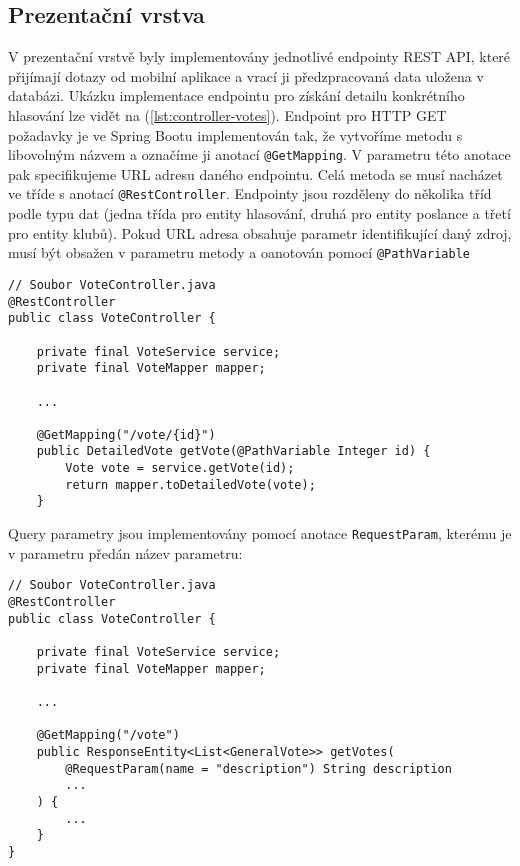\subsection {Prezentační vrstva}
V prezentační vrstvě byly implementovány jednotlivé endpointy REST API, které přijímají dotazy od mobilní aplikace a vrací ji předzpracovaná data uložena v databázi. Ukázku implementace endpointu pro získání detailu konkrétního hlasování lze vidět na (\ref{lst:controller-votes}). Endpoint pro HTTP GET požadavky je ve Spring Bootu implementován tak, že vytvoříme metodu s libovolným názvem a označíme ji anotací \lstinline|@GetMapping|. V parametru této anotace pak specifikujeme URL adresu daného endpointu. Celá metoda se musí nacházet ve tříde s anotací \lstinline|@RestController|. Endpointy jsou rozděleny do několika tříd podle typu dat (jedna třída pro entity hlasování, druhá pro entity poslance a třetí pro entity klubů). Pokud URL adresa obsahuje parametr identifikující daný zdroj, musí být obsažen v parametru metody a oanotován pomocí \lstinline|@PathVariable|

\begin{lstlisting}[caption={Ukázka kódu pro vytvoření endpointu}, label={lst:controller-votes}, tabsize=2]
// Soubor VoteController.java
@RestController
public class VoteController {
	
	private final VoteService service;
	private final VoteMapper mapper;
	
	...
	
 	@GetMapping("/vote/{id}")
	public DetailedVote getVote(@PathVariable Integer id) {
		Vote vote = service.getVote(id);
		return mapper.toDetailedVote(vote);
	}

\end{lstlisting}

\noindent Query parametry jsou implementovány pomocí anotace \lstinline|RequestParam|, kterému je v parametru předán název parametru: 

\begin{lstlisting}[caption={Ukázka endpointu s request parametrem}, label={lst:request-param}, tabsize=2]
// Soubor VoteController.java
@RestController
public class VoteController {
	
	private final VoteService service;
	private final VoteMapper mapper;
	
	...
	
	@GetMapping("/vote")
	public ResponseEntity<List<GeneralVote>> getVotes(
		@RequestParam(name = "description") String description
		...
	) {
		...
	}
}
\end{lstlisting}

